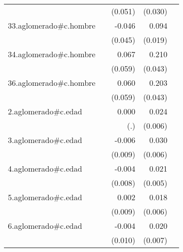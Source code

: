 {\begin{longtable}{l*{4}{D{.}{.}{-1}}}
            &                     &     (0.051)         &     (0.030)         &                     \\
\addlinespace
33.aglomerado#c.hombre&                     &      -0.046         &       0.094\sym{***}&                     \\
            &                     &     (0.045)         &     (0.019)         &                     \\
\addlinespace
34.aglomerado#c.hombre&                     &       0.067         &       0.210\sym{***}&                     \\
            &                     &     (0.059)         &     (0.043)         &                     \\
\addlinespace
36.aglomerado#c.hombre&                     &       0.060         &       0.203\sym{***}&                     \\
            &                     &     (0.059)         &     (0.043)         &                     \\
\addlinespace
2.aglomerado#c.edad&                     &       0.000         &       0.024\sym{***}&                     \\
            &                     &         (.)         &     (0.006)         &                     \\
\addlinespace
3.aglomerado#c.edad&                     &      -0.006         &       0.030\sym{***}&                     \\
            &                     &     (0.009)         &     (0.006)         &                     \\
\addlinespace
4.aglomerado#c.edad&                     &      -0.004         &       0.021\sym{***}&                     \\
            &                     &     (0.008)         &     (0.005)         &                     \\
\addlinespace
5.aglomerado#c.edad&                     &       0.002         &       0.018\sym{***}&                     \\
            &                     &     (0.009)         &     (0.006)         &                     \\
\addlinespace
6.aglomerado#c.edad&                     &      -0.004         &       0.020\sym{**} &                     \\
            &                     &     (0.010)         &     (0.007)         &                     \\

\end{longtable}}

